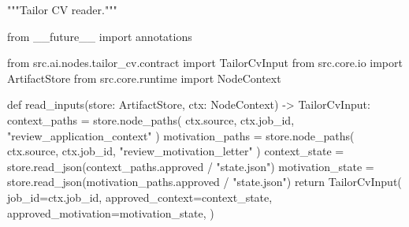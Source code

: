 """Tailor CV reader."""

from __future__ import annotations

from src.ai.nodes.tailor_cv.contract import TailorCvInput
from src.core.io import ArtifactStore
from src.core.runtime import NodeContext


def read_inputs(store: ArtifactStore, ctx: NodeContext) -> TailorCvInput:
    context_paths = store.node_paths(
        ctx.source, ctx.job_id, "review_application_context"
    )
    motivation_paths = store.node_paths(
        ctx.source, ctx.job_id, "review_motivation_letter"
    )
    context_state = store.read_json(context_paths.approved / "state.json")
    motivation_state = store.read_json(motivation_paths.approved / "state.json")
    return TailorCvInput(
        job_id=ctx.job_id,
        approved_context=context_state,
        approved_motivation=motivation_state,
    )

